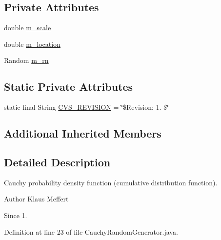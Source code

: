 \subsection*{Private Attributes}
\begin{DoxyCompactItemize}
\item 
double \hyperlink{classorg_1_1jgap_1_1impl_1_1_cauchy_random_generator_a6d9ef477f95ada68c829dc05938c1ca5}{m\-\_\-scale}
\item 
double \hyperlink{classorg_1_1jgap_1_1impl_1_1_cauchy_random_generator_a30a8446618e2ba879e31a09fbfcd5818}{m\-\_\-location}
\item 
Random \hyperlink{classorg_1_1jgap_1_1impl_1_1_cauchy_random_generator_a9897946e348321835339fa2a01f1ccae}{m\-\_\-rn}
\end{DoxyCompactItemize}
\subsection*{Static Private Attributes}
\begin{DoxyCompactItemize}
\item 
static final String \hyperlink{classorg_1_1jgap_1_1impl_1_1_cauchy_random_generator_a265f6cc2785a476a7ea6de340a6f3a35}{C\-V\-S\-\_\-\-R\-E\-V\-I\-S\-I\-O\-N} = \char`\"{}\$Revision\-: 1. \$\char`\"{}
\end{DoxyCompactItemize}
\subsection*{Additional Inherited Members}


\subsection{Detailed Description}
Cauchy probability density function (cumulative distribution function).

\begin{DoxyAuthor}{Author}
Klaus Meffert 
\end{DoxyAuthor}
\begin{DoxySince}{Since}
1. 
\end{DoxySince}


Definition at line 23 of file Cauchy\-Random\-Generator.\-java.



